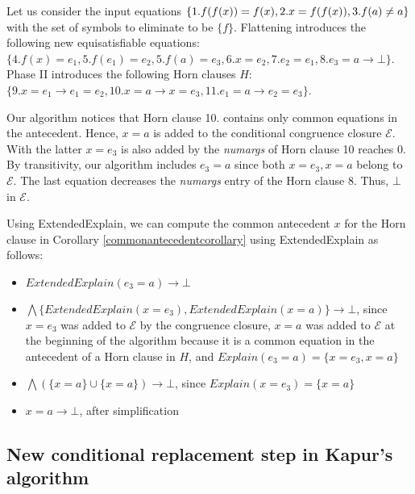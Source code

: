 \begin{example}
  Let us consider the input equations $\{
    1. f(f(x)) = f(x), \\ 2. x = f(f(x)), 
  3. f(a) \neq a\}$ 
  with the 
  set of symbols to eliminate to be 
  $\{ f \}$.
  Flattening introduces the following
  new equisatisfiable equations:
  $\{4. f(x) = e_1, 5. f(e_1) = e_2, 
    5. f(a) = e_3, 6. x = e_2, 7. e_2 = e_1, 
  8. e_3 = a \rightarrow \bot \}$. 
  Phase II introduces the following 
  Horn clauses $H$:
  $\{9. x = e_1 \rightarrow e_1 = e_2,
    10. x = a \rightarrow x = e_3,
    11. e_1 = a \rightarrow e_2 = e_3
  \}$.

  Our algorithm notices that Horn clause 10.
  contains only common equations in the
  antecedent. Hence, $x = a$ is added to the
  conditional congruence closure $\mathcal{E}$.
  With the latter $x = e_3$ is also added by
  the \emph{numargs} of Horn clause 10 reaches
  0. By transitivity, our algorithm
  includes $e_3 = a$ since both $x = e_3,
  x = a$ belong to $\mathcal{E}$.
  The last equation decreases the 
  \emph{numargs} entry of the Horn clause
  8. Thus, $\bot$ in $\mathcal{E}$.

  Using ExtendedExplain, we can compute the
  common antecedent $x$ 
  for the Horn clause in Corollary
  \ref{commonantecedentcorollary} using 
  ExtendedExplain as follows:

  \begin{itemize}
    \item $ExtendedExplain(e_3 = a) \rightarrow \bot$
    \item $\bigwedge \{ExtendedExplain(x = e_3), ExtendedExplain(x = a)\} \rightarrow \bot$, since
      $x = e_3$ was added to
      $\mathcal{E}$ by the congruence closure, $x = a$ was added to 
      $\mathcal{E}$ at the beginning of the algorithm because it is
      a common equation in the antecedent of a Horn clause in $H$,
      and $Explain(e_3 = a) = \{x = e_3, x = a\}$
    \item $\bigwedge(\{x = a\} \cup \{x = a\}) \rightarrow \bot$, 
      since $Explain(x = e_3) = \{x = a\}$
    \item $x = a \rightarrow \bot$, after simplification
  \end{itemize}

  \end{example}

  \subsection{New conditional replacement
  step in Kapur's algorithm}

